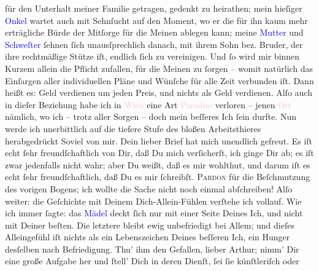                für den Unterhalt meiner Familie getragen, gedenkt zu heirathen; mein hieſiger \textcolor{blue}{Onkel}{} wartet
               auch mit Sehnſucht auf den Moment, wo er die für ihn kaum mehr erträgliche Bürde der
               Mitſorge für die Meinen ablegen kann; meine \textcolor{blue}{Mutter}{} und \textcolor{blue}{Schweſter}{} ſehnen ſich unausſprechlich danach, mit ihrem Sohn
               bez. Bruder, der ihre rechtmäßige Stütze iſt, endlich ſich {\pb}zu vereinigen. Und ſo wird mir binnen Kurzem allein
               die Pflicht zufallen, für die Meinen zu ſorgen – womit natürlich das Einſargen aller
               individuellen Pläne und Wünſche für alle Zeit verbunden iſt. Dann heißt es: Geld
               verdienen um jeden Preis, und nichts als Geld verdienen. Alſo auch in dieſer
               Beziehung habe ich in \textcolor{pink}{Wien}{}\ledrightnote{\textcolor{pink}{Wien}} eine Art \textcolor{pink}{Paradies}{} verloren – jenen \textcolor{pink}{Ort}{} nämlich, wo ich – trotz aller
               Sorgen – doch mein beſſeres Ich ſein durfte. Nun werde ich unerbittlich auf die
               tiefere Stufe des bloßen Arbeitsthieres herabgedrückt{\dotsfive}\pend
           \pstart
           Soviel von mir. Dein lieber Brief hat mich unendlich gefreut. Es iſt echt ſehr
               freundſchaftlich von Dir, daß Du mich verſicherſt, ich ginge Dir ab; es iſt zwar
               jedenfalls nicht wahr; aber Du weißt, daß es mir wohlthut, und darum iſt es echt ſehr
               freundſchaftlich, daß Du es mir ſchreibſt.\pend
           \pstart
           {\pb}\textsc{Pardon} für die Beſchmutzung des vorigen Bogens; ich wollte
               die Sache nicht noch einmal abſchreiben!\pend
           \pstart
           Alſo weiter: die Geſchichte mit Deinem Dich-Allein-Fühlen verſtehe ich vollauf. Wie
               ich immer ſagte: das \textcolor{blue}{Mädel}{} deckt ſich nur mit einer Seite Deines Ich, und nicht
               mit Deiner beſten. Die letztere bleibt ewig unbefriedigt bei Allem; und dieſes
               Alleingefühl iſt nichts als ein Lebenszeichen Deines beſſeren Ich, ein Hunger
               desſelben nach Befriedigung. Thu’ ihm den Gefallen, lieber Arthur; nimm’ Dir eine
               große Aufgabe her und ſtell’ Dich in deren Dienſt, ſei ſie künſtleriſch oder
